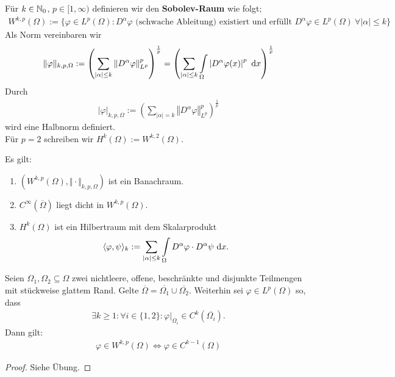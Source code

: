 \begin{definition}
Für $k\in\mathbb{N}_0$, $p\in[1,\infty)$ definieren wir den \textbf{Sobolev-Raum} wie folgt;
\begin{align}
W^{k,p}(\Omega):=\Big\lbrace\varphi\in L^p(\Omega):D^\alpha\varphi\text{ (schwache Ableitung) existiert und erfüllt }D^\alpha\varphi\in L^p(\Omega)~\forall|\alpha|\leq k\Big\rbrace
\end{align}
Als Norm vereinbaren wir
\begin{align*}
\Vert\varphi\Vert_{k,p,\Omega}:=\left(\sum\limits_{|\alpha|\leq k}\left\Vert D^\alpha\varphi\right\Vert^p_{L^p}\right)^{\frac{1}{p}}
=\left(\sum\limits_{|\alpha|\leq k}\int\limits_\Omega\left| D^\alpha\varphi(x)\right|^p\text{ d} x\right)^{\frac{1}{p}}
\end{align*}
Durch
\begin{align*}
|\varphi|_{k,p,\Omega}:=\left(\sum\limits_{|\alpha|= k}\left\Vert D^\alpha\varphi\right\Vert^p_{L^p}\right)^{\frac{1}{p}}
\end{align*}
wird eine Halbnorm definiert.\\
Für $p=2$ schreiben wir $H^k(\Omega):=W^{k,2}(\Omega)$.
\end{definition}

\begin{satz}
Es gilt:
\begin{enumerate}
\item $\left(W^{k,p}(\Omega),\Vert\cdot\Vert_{k,p,\Omega}\right)$ ist ein Banachraum.
\item $C^\infty(\overline{\Omega})$ liegt dicht in $W^{k,p}(\Omega)$.
\item $H^k(\Omega)$ ist ein Hilbertraum mit dem Skalarprodukt
\begin{align*}
\langle \varphi,\psi\rangle_k:=\sum\limits_{|\alpha|\leq k}\int\limits_\Omega D^\alpha\varphi\cdot D^\alpha\psi\text{ d} x.
\end{align*}
\end{enumerate}
\end{satz}

\begin{satz}\label{satz1.4}\enter
Seien $\Omega_1,\Omega_2\subseteq\Omega$ zwei nichtleere, offene, beschränkte und disjunkte Teilmengen mit stückweise glattem Rand. Gelte
$\overline{\Omega}=\overline{\Omega_1}\cup\overline{\Omega_2}$.
Weiterhin sei $\varphi\in L^p(\Omega)$ so, dass 
\begin{align*}
\exists k\geq 1:\forall i\in\lbrace1,2\rbrace:\varphi|_{\Omega_i}\in C^k(\overline{\Omega_i}).
\end{align*}
Dann gilt:
\begin{align*}
\varphi\in W^{k,p}(\Omega)\Longleftrightarrow\varphi\in C^{k-1}(\Omega)
\end{align*}
\end{satz}
\begin{proof}
Siehe Übung.
\end{proof}

